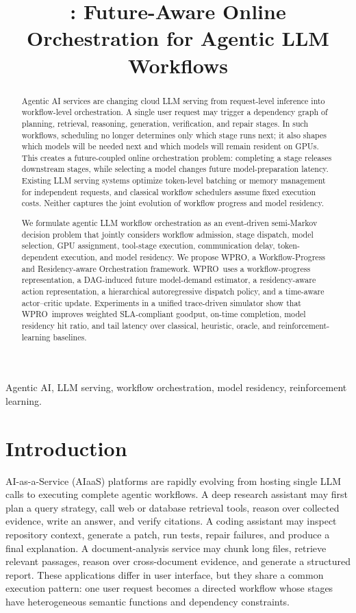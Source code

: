 \documentclass[10pt,conference]{IEEEtran}
\title{\WPRO: Future-Aware Online Orchestration for Agentic LLM Workflows}
\author{\IEEEauthorblockN{Anonymous Authors}
\IEEEauthorblockA{Paper draft for INFOCOM-style submission}}
\newcommand{\WPRO}{\textsc{WPRO}}
\begin{document}
\maketitle

\begin{abstract}
Agentic AI services are changing cloud LLM serving from request-level inference into workflow-level orchestration. A single user request may trigger a dependency graph of planning, retrieval, reasoning, generation, verification, and repair stages. In such workflows, scheduling no longer determines only which stage runs next; it also shapes which models will be needed next and which models will remain resident on GPUs. This creates a future-coupled online orchestration problem: completing a stage releases downstream stages, while selecting a model changes future model-preparation latency. Existing LLM serving systems optimize token-level batching or memory management for independent requests, and classical workflow schedulers assume fixed execution costs. Neither captures the joint evolution of workflow progress and model residency.

We formulate agentic LLM workflow orchestration as an event-driven semi-Markov decision problem that jointly considers workflow admission, stage dispatch, model selection, GPU assignment, tool-stage execution, communication delay, token-dependent execution, and model residency. We propose \WPRO, a Workflow-Progress and Residency-aware Orchestration framework. \WPRO\ uses a workflow-progress representation, a DAG-induced future model-demand estimator, a residency-aware action representation, a hierarchical autoregressive dispatch policy, and a time-aware actor--critic update. Experiments in a unified trace-driven simulator show that \WPRO\ improves weighted SLA-compliant goodput, on-time completion, model residency hit ratio, and tail latency over classical, heuristic, oracle, and reinforcement-learning baselines.
\end{abstract}

\begin{IEEEkeywords}
Agentic AI, LLM serving, workflow orchestration, model residency, reinforcement learning.
\end{IEEEkeywords}

\section{Introduction}

AI-as-a-Service (AIaaS) platforms are rapidly evolving from hosting single LLM calls to executing complete agentic workflows. A deep research assistant may first plan a query strategy, call web or database retrieval tools, reason over collected evidence, write an answer, and verify citations. A coding assistant may inspect repository context, generate a patch, run tests, repair failures, and produce a final explanation. A document-analysis service may chunk long files, retrieve relevant passages, reason over cross-document evidence, and generate a structured report. These applications differ in user interface, but they share a common execution pattern: one user request becomes a directed workflow whose stages have heterogeneous semantic functions and dependency constraints.
\end{document}
